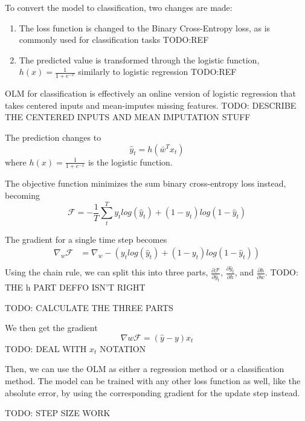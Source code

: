 To convert the model to classification, two changes are made:
\begin{enumerate}
  \item The loss function is changed to the Binary Cross-Entropy loss, as is
    commonly used for classification tasks TODO:REF
  \item The predicted value is transformed through the logistic function,
    $h(x)=\frac{1}{1+e^{-x}}$ similarly to logistic regression TODO:REF
\end{enumerate}
OLM for classification is effectively an online version of logistic regression that
takes centered inputs and mean-imputes missing features. TODO: DESCRIBE THE
CENTERED INPUTS AND MEAN IMPUTATION STUFF

The prediction changes to
\begin{equation}
  \hat y_t = h(\bar w^T x_t)
\end{equation}
where $h(x)=\frac{1}{1+e^{-x}}$ is the logistic function.

The objective function minimizes the sum binary cross-entropy loss instead, becoming
\begin{equation}
  \mathcal F = -\frac{1}{T} \sum_t^T y_t log(\hat y_t) + (1-y_t) log(1-\hat y_t)
\end{equation}

The gradient for a single time step becomes
\begin{align}
  \nabla_w \mathcal F &= \nabla_w -(y_t log(\hat y_t) + (1-y_t) log(1-\hat y_t)) \\
\end{align}
Using the chain rule, we can split this into three parts, $\frac{\partial
\mathcal F}{\partial \hat y_t}$, $\frac{\partial \hat y_t}{\partial h}$, and
$\frac{\partial h}{\partial w}$. TODO: THE h PART DEFFO ISN'T RIGHT

TODO: CALCULATE THE THREE PARTS


We then get the gradient
\begin{equation}
  \nabla w \mathcal F = (\hat y - y) x_t
\end{equation}
TODO: DEAL WITH $x_t$ NOTATION

Then, we can use the OLM as either a regression method or a classification
method. The model can be trained with any other loss function as well, like the
absolute error, by using the corresponding gradient for the update step
instead. 

TODO: STEP SIZE WORK



